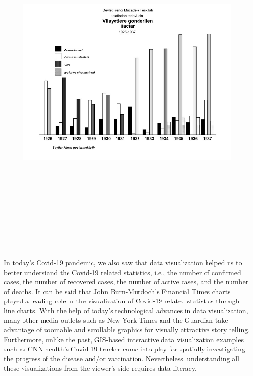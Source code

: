 \begin{figure}[hbt!]
	\centering
	\includegraphics[width=13cm,height=18cm,keepaspectratio]{frengi_ggpattern.png}
\end{figure}


In today's Covid-19 pandemic, we also saw that data visualization helped us to better understand the Covid-19 related statistics, i.e., the number of confirmed cases, the number of recovered cases, the number of active cases, and the number of deaths. It can be said that John Burn-Murdoch’s Financial Times charts played a leading role in the visualization of Covid-19 related statistics through line charts. With the help of today's technological advances in data visualization, many other media outlets such as New York Times and the Guardian take advantage of zoomable and scrollable graphics for visually attractive story telling. Furthermore, unlike the past, GIS-based interactive data visualization examples such as CNN health's Covid-19 tracker \citep{CNN} came into play for spatially investigating the progress of the disease and/or vaccination. Nevertheless, understanding all these visualizations from the viewer's side requires data literacy.

